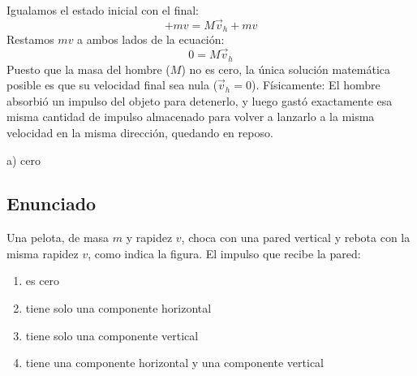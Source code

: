 \documentclass[12pt, a4paper]{article}
\begin{document}
Igualamos el estado inicial con el final:
$$ +mv = M\vec{v}_h + mv $$
Restamos $mv$ a ambos lados de la ecuación:
$$ 0 = M\vec{v}_h $$
Puesto que la masa del hombre ($M$) no es cero, la única solución matemática posible es que su velocidad final sea nula ($\vec{v}_h = 0$). 
Físicamente: El hombre absorbió un impulso del objeto para detenerlo, y luego gastó exactamente esa misma cantidad de impulso almacenado para volver a lanzarlo a la misma velocidad en la misma dirección, quedando en reposo.

\begin{tcolorbox}[colback=green!5!white, colframe=green!50!black, title=Respuesta Final]
\centering \Large a) cero
\end{tcolorbox}

\newpage

\subsection*{Enunciado}
Una pelota, de masa $m$ y rapidez $v$, choca con una pared vertical y rebota con la misma rapidez $v$, como indica la figura. El impulso que recibe la pared:

\begin{center}
\end{center}

\begin{enumerate}[label=\alph*)]
    \item es cero
    \item tiene solo una componente horizontal
    \item tiene solo una componente vertical
    \item tiene una componente horizontal y una componente vertical
\end{enumerate}
\end{document}
